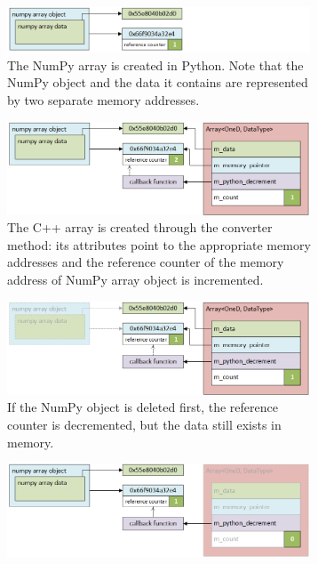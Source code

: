 \begin{figure}[h!]
    \centering
    \begin{subfigure}{0.9\textwidth}
        \includegraphics[width=0.99\textwidth]{img/array_creation_deletion_a}
        \caption{The NumPy array is created in Python. Note that the NumPy 
        object and the data it contains are represented by two separate memory addresses.}
        \label{fig:array_creation_deletion_a}
    \end{subfigure}
    \begin{subfigure}{0.9\textwidth}
        \includegraphics[width=0.99\textwidth]{img/array_creation_deletion_b}
        \caption{The C++ array is created through the converter method: its attributes 
        point to the appropriate memory addresses and the reference counter of the 
        memory address of NumPy array object is incremented.}
        \label{fig:array_creation_deletion_b}
    \end{subfigure}
    \begin{subfigure}{0.9\textwidth}
        \includegraphics[width=0.99\textwidth]{img/array_creation_deletion_c}
        \caption{If the NumPy object is deleted first, the reference counter is 
        decremented, but the data still exists in memory.}
        \label{fig:array_creation_deletion_c}
    \end{subfigure}
    \begin{subfigure}{0.9\textwidth}
        \includegraphics[width=0.99\textwidth]{img/array_creation_deletion_d}

\end{subfigure}
\end{figure}
